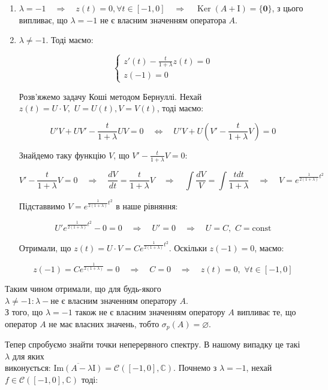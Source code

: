 \documentclass[a5paper, 20pt, titlepage]{article}
\DeclareMathOperator{\Ker}{Ker}
\newcommand{\I}{\mathrm{I}}
\newcommand{\Ima}{\text{Im}}
\begin{document}
\begin{enumerate}
\item $ \lambda = -1 \quad \Rightarrow \quad z(t) = 0, \forall t \in[-1, 0] \quad \Rightarrow \quad \Ker(A + \I) = \{\textbf{0}\}$, з цього випливає, що $\lambda = -1$ не є власним значенням оператора $A$. 

\item $\lambda \neq -1$. Тоді маємо:

$$
\begin{cases}
z'(t) - \frac{t}{1+\lambda} z(t) = 0\\
z(-1) = 0
\end{cases}
$$

Розв'яжемо задачу Коші методом Бернуллі. Нехай $z(t) = U \cdot V, \,\, U = U(t), V = V(t)$, тоді маємо:

$$ U'V + UV' - \frac{t}{1 + \lambda} U V = 0 \quad \Leftrightarrow \quad U'V + U \left( V' - \frac{t}{1 + \lambda} V \right) = 0 $$

Знайдемо таку функцію $V$, що $V' - \frac{t}{1 + \lambda} V = 0$:

$$V' - \frac{t}{1 + \lambda} V = 0 \quad \Rightarrow \quad \frac{dV}{dt} = \frac{t}{1+\lambda} V \quad \Rightarrow \quad \int \frac{dV}{V} = \int \frac{t dt}{1 + \lambda} \quad \Rightarrow \quad V = e^{\frac{1}{2(1+\lambda)} t^2}$$

\vspace{3mm}
Підставвимо $V = e^{\frac{1}{2(1+\lambda)} t^2}$ в наше рівняння:

$$U' e^{\frac{1}{2(1+\lambda)} t^2} - 0 = 0 \quad \Rightarrow \quad U' = 0 \quad \Rightarrow \quad U = C, \,\, C = \text{const}$$

\newpage{}
Отримали, що $z(t) = U \cdot V = C e^{\frac{1}{2(1+\lambda)} t^2}$. Оскільки $z(-1) = 0$, маємо:

\vspace{-3mm}
$$ z(-1) = C e^{\frac{1}{2(1+\lambda)}} = 0 \quad \Rightarrow \quad C = 0 \quad \Rightarrow \quad z(t) = 0, \,\, \forall t \in [-1, 0] $$

\end{enumerate}

Таким чином отримали, що для будь-якого $\lambda \neq -1: \lambda - \text{не є власним значенням оператору $A$}$. \\ З того, що $\lambda = -1 $ також не є власним значенням оператору $A$ випливає те, що оператор $A$ не має власних значень, тобто $\sigma_p(A) = \varnothing$.

Тепер спробуємо знайти точки неперервного спектру. В нашому випадку це такі $\lambda$ для яких \\ виконується: $\overline{\Ima (A - \lambda \I)} = \mathcal{C} \left( [-1, 0], \mathbb{C} \right)$. Почнемо з $\lambda = -1$, нехай $f \in \mathcal{C} \left( [-1, 0], \mathbb{C} \right)$ тоді:
\end{document}
